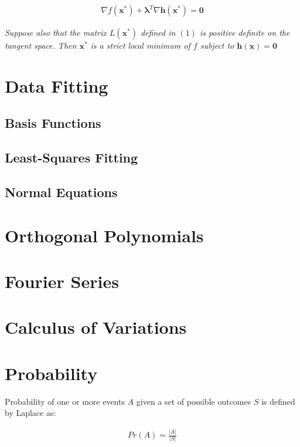 \documentclass[11pt]{article}
\begin{document}
\begin{align*}
    \nabla f\left(\boldsymbol{x}^{*}\right) + \boldsymbol{\lambda}^{T}\nabla\boldsymbol{h}\left(\boldsymbol{x}^{*}\right) = \boldsymbol{0}
\end{align*}

\emph{Suppose also that the matrix \(L\left(\boldsymbol{x}^{*}\right)\) defined in \(\left(1\right)\) is positive definite on the tangent space. Then \(\boldsymbol{x}^{*}\) is a strict local minimum of \(f\) subject to \(\boldsymbol{h}\left(\boldsymbol{x}\right) = \boldsymbol{0}\)}

\section{Data Fitting}
\label{sec:orgf87efa5}
\subsection{Basis Functions}
\label{sec:org6c47c38}
\subsection{Least-Squares Fitting}
\label{sec:org47e7838}
\subsection{Normal Equations}
\label{sec:orgebec895}
\section{Orthogonal Polynomials}
\label{sec:org52e06c8}
\section{Fourier Series}
\label{sec:org491cb17}
\section{Calculus of Variations}
\label{sec:org762d0a0}
\section{Probability}
\label{sec:org7423bda}
Probability of one or more events \(A\) given a set of possible outcomes \(S\) is defined by Laplace as:

\begin{align*}
    Pr\left(A\right) = \frac{\vert A \vert}{\vert S \vert}
\end{align*}
\end{document}
